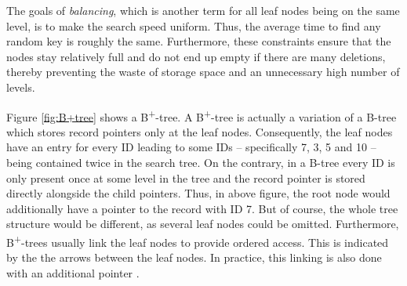 The goals of \emph{balancing}, which is another term for all leaf nodes being on the same level, is to make the search speed uniform. Thus, the average time to find any random key is roughly the same. Furthermore, these constraints ensure that the nodes stay relatively full and do not end up empty if there are many deletions, thereby preventing the waste of storage space and an unnecessary high number of levels.\par 
Figure \ref{fig:B+tree} shows a B\textsuperscript{+}-tree. A B\textsuperscript{+}-tree is actually a variation of a B-tree which stores record pointers only at the leaf nodes. Consequently, the leaf nodes have an entry for every ID leading to some IDs -- specifically 7, 3, 5 and 10 -- being contained twice in the search tree. On the contrary, in a B-tree every ID is only present once at some level in the tree and the record pointer is stored directly alongside the child pointers. Thus, in above figure, the root node would additionally have a pointer to the record with ID 7. But of course, the whole tree structure would be different, as several leaf nodes could be omitted. Furthermore, B\textsuperscript{+}-trees usually link the leaf nodes to provide ordered access. This is indicated by the the arrows between the leaf nodes. In practice, this linking is also done with an additional pointer \cite{DatabaseFundamentals}.\\

